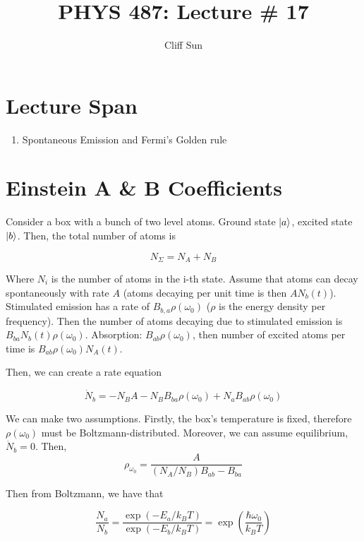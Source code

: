 \documentclass{article}
\title{PHYS 487: Lecture \# 17}
\author{Cliff Sun}
\newtheorem{one minute paper}[theorem]{One Minute Paper}
\begin{document}
\maketitle

\section*{Lecture Span}
\begin{enumerate}
    \item Spontaneous Emission and Fermi's Golden rule
\end{enumerate}

\section*{Einstein A \& B Coefficients}

Consider a box with a bunch of two level atoms. Ground state $\ket{a}$, excited state $\ket{b}$. Then, the total number of atoms is 

\begin{equation}
    N_{\Sigma} = N_A + N_B
\end{equation}

Where $N_i$ is the number of atoms in the i-th state. Assume that atoms can decay spontaneously with rate $A$ (atoms decaying per unit time is then $AN_b(t)$). 
Stimulated emission has a rate of $B_{b,a}\rho(\omega_0)$ ($\rho$ is the energy density per frequency). Then the number of atoms decaying due to stimulated emission is $B_{ba}N_b(t)\rho(\omega_0)$.
Absorption: $B_{ab}\rho(\omega_0)$, then number of excited atoms per time is $B_{ab}\rho(\omega_0)N_A(t)$. 

\par Then, we can create a rate equation

\begin{equation}
    \dot{N}_{b} = -N_B A - N_B B_{ba}\rho(\omega_0) + N_a B_{ab}\rho(\omega_0)
\end{equation}

We can make two assumptions. Firstly, the box's temperature is fixed, therefore $\rho(\omega_0)$ must be Boltzmann-distributed. Moreover, we can assume equilibrium, $\dot{N}_b = 0$. Then,
\begin{equation}
    \rho_{\omega_0} = \frac{A}{(N_A/N_B)B_{ab} - B_{ba}}
\end{equation}

Then from Boltzmann, we have that 

\begin{equation}
    \frac{N_a}{N_b} = \frac{\exp(-E_a/k_BT)}{\exp(-E_b/k_B T)} = \exp(\frac{\hbar \omega_0}{k_B T})
\end{equation}
\end{document}
